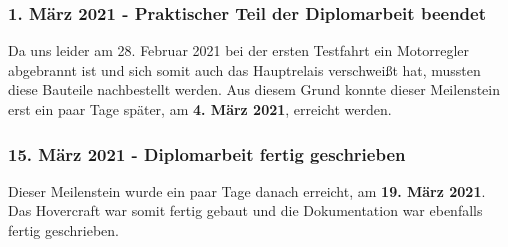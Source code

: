 \subsubsection*{1. März 2021 - Praktischer Teil der Diplomarbeit beendet}
Da uns leider am 28. Februar 2021 bei der ersten Testfahrt ein Motorregler abgebrannt ist und sich somit auch das Hauptrelais verschweißt hat, mussten
diese Bauteile nachbestellt werden. Aus diesem Grund konnte dieser Meilenstein erst ein paar Tage später, am \textbf{4. März 2021}, erreicht werden.  \\

\subsubsection*{15. März 2021 - Diplomarbeit fertig geschrieben}
Dieser Meilenstein wurde ein paar Tage danach erreicht, am \textbf{19. März 2021}. Das Hovercraft war somit fertig gebaut und die Dokumentation war ebenfalls fertig geschrieben. \\


